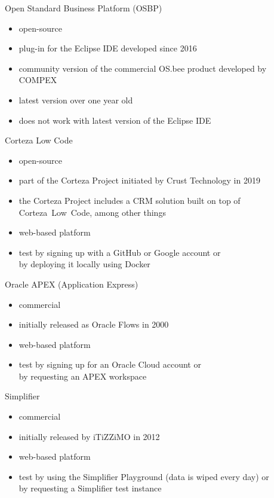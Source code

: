 \documentclass[aspectratio=169]{beamer}
\begin{document}
  \begin{frame}{Open Standard Business Platform (OSBP)}
    \begin{itemize}
      \item open-source
      \item plug-in for the Eclipse IDE developed since 2016
      \item community version of the commercial OS.bee product developed by COMPEX
      \item latest version over one year old
      \item does not work with latest version of the Eclipse IDE
    \end{itemize}
  \end{frame}

  \begin{frame}{Corteza Low Code}
    \begin{itemize}
      \item open-source
      \item part of the Corteza Project initiated by Crust Technology in 2019
      \item the Corteza Project includes a CRM solution built on top of Corteza~Low~Code, among other things
      \item web-based platform
      \item test by signing up with a GitHub or Google account or \\
            by deploying it locally using Docker
    \end{itemize}
  \end{frame}

  \begin{frame}{Oracle APEX (Application Express)}
    \begin{itemize}
      \item commercial
      \item initially released as Oracle Flows in 2000
      \item web-based platform
      \item test by signing up for an Oracle Cloud account or \\
            by requesting an APEX workspace
    \end{itemize}
  \end{frame}

  \begin{frame}{Simplifier}
    \begin{itemize}
      \item commercial
      \item initially released by iTiZZiMO in 2012
      \item web-based platform
      \item test by using the Simplifier Playground (data is wiped every day) or \\
            by requesting a Simplifier test instance
    \end{itemize}
  \end{frame}
\end{document}
